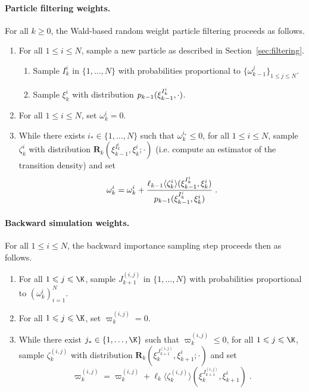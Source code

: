 \documentclass{article}
\newcommand{\N}{N}
\newcommand{\kissforward}[3][]
{\ifthenelse{\equal{#1}{}}{p_{#2}}
{\ifthenelse{\equal{#1}{fully}}{p^{\star}_{#2}}
{\ifthenelse{\equal{#1}{smooth}}{\tilde{r}_{#2}}{\mathrm{erreur}}}}}
\newcommand{\adjfuncforward}[1]{\vartheta_{#1}}
\newcommand{\eqsp}{\;}
\newcommand{\ewght}[2]{\ensuremath{\omega_{#1}^{#2}}}
\newcommand{\epart}[2]{\ensuremath{\xi_{#1}^{#2}}}
\newcommand{\kernelmarg}{\mathbf{R}}
\newcommand{\hatqg}[1]{\mathsf{\ell}_{#1}}
\begin{document}
\paragraph{Particle filtering weights.}  
For all $k\geqslant 0$, the Wald-based random weight particle filtering proceeds as follows.
\begin{enumerate}
\item For all $1\leqslant i\leqslant \N$, sample a new particle as described in Section~\ref{sec:filtering}.
\begin{enumerate}
\item Sample $I_k^{i}$ in $\{1,\ldots,\N\}$ with probabilities proportional to $\{\ewght{k-1}{j} 
\}_{1\leqslant j\leqslant \N}$.
\item Sample $\epart{k}{i}$ with distribution $\kissforward{k-1}{k-1}(\epart{k-1}{I_k^{i}},\cdot)$.
\end{enumerate}
\item For all $1\leqslant i\leqslant \N$, set  $\ewght{k}{i}= 0$.
\item While there exists $i_* \in\{1,\ldots,\N\}$ such that $\ewght{k}{i_*} \leqslant 0$, for all $1\leqslant i\leqslant \N$, sample $\zeta_k^{i}$ with distribution $\kernelmarg_{k}(\epart{k-1}{I_k^{i}},\epart{k}{i};\cdot)$ (i.e. compute an estimator of the transition density) and set 
$$
\ewght{k}{i}  = \ewght{k}{i} + \frac{\hatqg{k-1}\langle \zeta_k^i\rangle(\epart{k-1}{I_k^{i}},\epart{k}{i}) }{\kissforward{k-1}{k-1}(\epart{k-1}{I_k^{i}},\epart{k}{i})}\eqsp.
$$
\end{enumerate}
\paragraph{Backward simulation weights.} For all $1\leqslant i\leqslant \N$, the backward importance sampling step proceeds then as follows.
\begin{enumerate}
\item For all $1\leqslant j\leqslant \K$,   sample $J_{k+1}^{(i,j)}$ in $\{1,\ldots, \N\}$ with probabilities proportional to  $(\omega^{i}_k)_{i=1}^{\N}$. 
\item For all $1\leqslant j\leqslant \K$, set  $\varpi_k^{(i,j)}= 0$.
\item While there exist $j_* \in\{1,\ldots,\K\}$ such that $\varpi_k^{(i,j)} \leqslant 0$, for all $1\leqslant j\leqslant \K$, sample $\zeta_k^{(i,j)}$  with distribution $\kernelmarg_{k}(\epart{k}{J_{k+1}^{(i,j)}}, \epart{k+1}{i};\cdot)$ and set 
$$
\varpi_k^{(i,j)} = \varpi_k^{(i,j)} +  \hatqg{k}\langle \zeta_k^{(i,j)} \rangle(\epart{k}{J_{k+1}^{(i,j)}}, \epart{k+1}{i})\eqsp.
$$
\end{enumerate}
\end{document}
